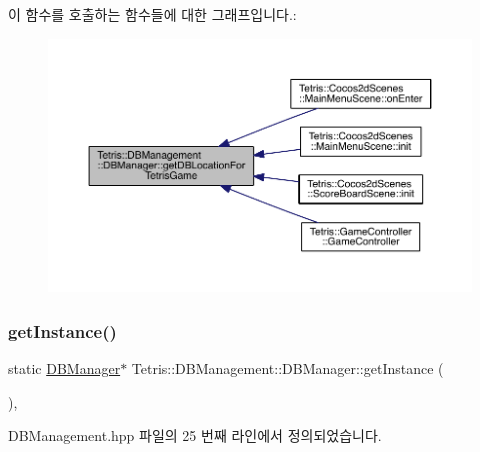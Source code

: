 이 함수를 호출하는 함수들에 대한 그래프입니다.\+:
\nopagebreak
\begin{figure}[H]
\begin{center}
\leavevmode
\includegraphics[width=350pt]{class_tetris_1_1_d_b_management_1_1_d_b_manager_ae50cfd222e276a5ca27e17c886aa5dd5_icgraph}
\end{center}
\end{figure}
\mbox{\label{class_tetris_1_1_d_b_management_1_1_d_b_manager_a9cb81505055490211a9b5c79c3c22c18}} 
\subsubsection{\texorpdfstring{get\+Instance()}{getInstance()}}
{\footnotesize\ttfamily static \hyperlink{class_tetris_1_1_d_b_management_1_1_d_b_manager}{D\+B\+Manager}$\ast$ Tetris\+::\+D\+B\+Management\+::\+D\+B\+Manager\+::get\+Instance (\begin{DoxyParamCaption}{ }\end{DoxyParamCaption})\hspace{0.3cm}{\ttfamily [inline]}, {\ttfamily [static]}}



D\+B\+Management.\+hpp 파일의 25 번째 라인에서 정의되었습니다.

